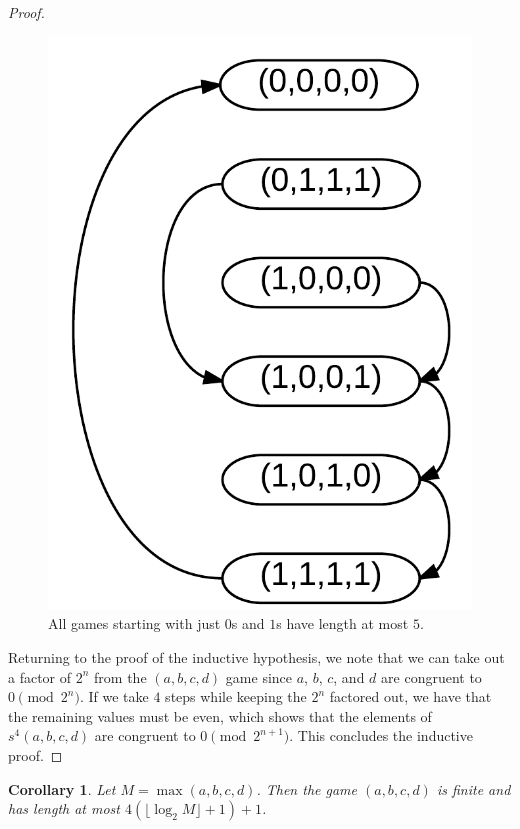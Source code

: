 \documentclass[12pt]{amsart}
\newtheorem{corollary}[theorem]{Corollary}
\newcommand{\diff}{s}
\begin{document}
\begin{proof}
\begin{figure}
\includegraphics{number_squares_0s_and_1s.png}
\caption{All games starting with just $0$s and $1$s have length at most $5$.}
\label{fig:zerosones}
\end{figure}

Returning to the proof of the inductive hypothesis, we note that we can take out a factor of $2^n$ from the $(a,b,c,d)$ game since $a$, $b$, $c$, and $d$ are congruent to $0\pmod{2^n}$. If we take $4$ steps while keeping the $2^n$ factored out, we have that the remaining values must be even, which shows that the elements of $\diff^4(a,b,c,d)$ are congruent to $0\pmod{2^{n+1}}$. This concludes the inductive proof.

\end{proof}

\begin{corollary}
Let $M=\max(a,b,c,d)$. Then the game $(a,b,c,d)$ is finite and has length at most $4(\lfloor\log_2{M}\rfloor + 1) + 1$.
\end{corollary}
\end{document}
